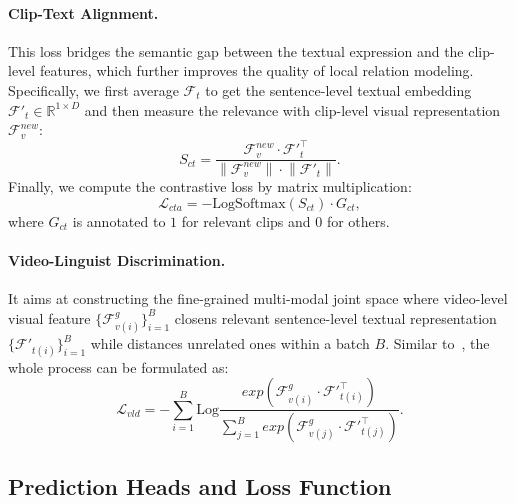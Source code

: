 \documentclass[10pt,twocolumn,letterpaper]{article}
\begin{document}
\paragraph{Clip-Text Alignment.} This loss bridges the semantic gap between the textual expression and the clip-level features, which further improves the quality of local relation modeling. Specifically, we first average $\mathcal{F}_t$ to get the sentence-level textual embedding $\mathcal{F'}_t \in \mathbb{R}^{1 \times D}$ and then measure the relevance with clip-level visual representation $\mathcal{F}_v^{new}$:
\begin{equation}
    S_{ct} = \frac{\mathcal{F}_v^{new}\cdot \mathcal{F'}_t^{\top } }{\left \| \mathcal{F}_v^{new} \right \|\cdot \left \|  \mathcal{F'}_t \right \| }. 
\label{cta}
\end{equation}
Finally, we compute the contrastive loss by matrix multiplication:
\begin{equation}
    \mathcal{L}_{cta} = -\mathrm{LogSoftmax}\left(S_{ct}\right)\cdot G_{ct},
\label{cta_loss}
\end{equation}
where $G_{ct}$ is annotated to $1$ for relevant clips and $0$ for others.
\paragraph{Video-Linguist Discrimination.} It aims at constructing the fine-grained multi-modal joint space where video-level visual feature $\{\mathcal{F}_{v(i)}^g\}_{i=1}^{B}$ closens relevant sentence-level textual representation $\{\mathcal{F'}_{t(i)}\}_{i=1}^{B}$ while distances unrelated ones within a batch $B$.
Similar to~\cite{clip}, the whole process can be formulated as:  
\begin{equation}
    \mathcal{L}_{vld} = -\sum_{i=1}^{B}\mathrm{Log}\frac{exp\left(\mathcal{F}_{v(i)}^g \cdot \mathcal{F'}_{t(i)}^{\top}\right)}{\sum_{j=1}^B exp\left(\mathcal{F}_{v(j)}^g \cdot \mathcal{F'}_{t(j)}^{\top}\right)}.
\end{equation}

\subsection{Prediction Heads and Loss Function}
\label{sec:phlf}
\end{document}
